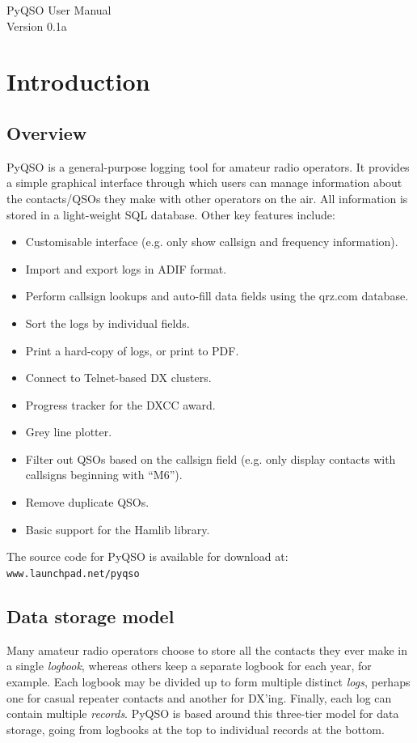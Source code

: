 \documentclass[11pt, a4paper]{report}
\begin{document}
\begin{titlepage}
\begin{center}
\vspace*{5cm}
\huge{PyQSO User Manual}\\\vspace*{5cm}
\LARGE{Version 0.1a}
\end{center}
\end{titlepage}

\tableofcontents

\chapter{Introduction}\label{chap:introduction}
\section{Overview}
PyQSO is a general-purpose logging tool for amateur radio operators. It provides a simple graphical interface through which users can manage information about the contacts/QSOs they make with other operators on the air. All information is stored in a light-weight SQL database. Other key features include:
\begin{itemize}
  \item Customisable interface (e.g. only show callsign and frequency information).
  \item Import and export logs in ADIF format.
  \item Perform callsign lookups and auto-fill data fields using the qrz.com database.
  \item Sort the logs by individual fields.
  \item Print a hard-copy of logs, or print to PDF.
  \item Connect to Telnet-based DX clusters.
  \item Progress tracker for the DXCC award.
  \item Grey line plotter.
  \item Filter out QSOs based on the callsign field (e.g. only display contacts with callsigns beginning with ``M6'').
  \item Remove duplicate QSOs.
  \item Basic support for the Hamlib library.
\end{itemize}
The source code for PyQSO is available for download at: \texttt{www.launchpad.net/pyqso}

\section{Data storage model}
Many amateur radio operators choose to store all the contacts they ever make in a single \textit{logbook}, whereas others keep a separate logbook for each year, for example. Each logbook may be divided up to form multiple distinct \textit{logs}, perhaps one for casual repeater contacts and another for DX'ing. Finally, each log can contain multiple \textit{records}. PyQSO is based around this three-tier model for data storage, going from logbooks at the top to individual records at the bottom. 
\end{document}
